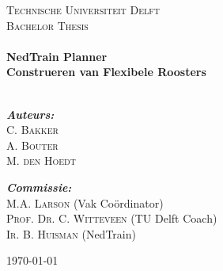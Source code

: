 
\usepackage{amsmath}
\usepackage{amssymb}
\usepackage{pdfpages}
\usepackage{tikz}
\usepackage{rotating}
\usepackage{float}
\usepackage{fancyhdr}



\begin{titlepage}
\center
\textsc{Technische Universiteit Delft}\\[0.2cm]
\textsc{\Huge Bachelor Thesis}\\[1.5cm]
\HRule \\[0.4cm]
{\Huge \bfseries NedTrain Planner}\\[0.5cm]
{\LARGE \bfseries Construeren van Flexibele Roosters}\\[0.4cm]
\HRule \\[1.5cm]

\begin{large}
\begin{minipage}{0.3\textwidth}
\begin{flushleft}
\textit{ \bfseries Auteurs:}\\
\textsc{C. Bakker}\\
\textsc{A. Bouter}\\
\textsc{M. den Hoedt}\\
\end{flushleft}
\end{minipage}
\begin{minipage}{0.6\textwidth}
\begin{flushright}
\textit{ \bfseries Commissie:}\\
\textsc{M.A. Larson} {\normalsize (Vak Co\"ordinator)}\\
\textsc{Prof. Dr. C. Witteveen} {\normalsize (TU Delft Coach)}\\
\textsc{Ir. B. Huisman} {\normalsize (NedTrain)}\\
\end{flushright}
\end{minipage}
\end{large}


\vfill
{\large \today}\\[2cm]


\end{titlepage}
